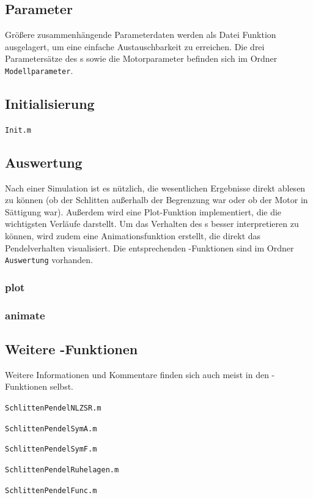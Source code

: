 \subsection{Parameter}

Größere zusammenhängende Parameterdaten werden als Datei \bzw Funktion ausgelagert, um eine einfache Austauschbarkeit zu erreichen.
Die drei Parametersätze des \spd s  sowie die Motorparameter befinden sich im Ordner \texttt{Modellparameter}.


\subsection{Initialisierung}\label{subsec:init}

\texttt{Init.m}


\subsection{Auswertung}

Nach einer Simulation ist es nützlich, die wesentlichen Ergebnisse direkt ablesen zu können (\zB ob der Schlitten außerhalb der Begrenzung war oder ob der Motor in Sättigung war).
Außerdem wird eine Plot-Funktion implementiert, die die wichtigsten Verläufe darstellt.
Um das Verhalten des \dpd s besser interpretieren zu können, wird zudem eine Animationsfunktion erstellt, die direkt das Pendelverhalten visualisiert.
Die entsprechenden \ml-Funktionen sind im Ordner \texttt{Auswertung} vorhanden.

\subsubsection{plot}

\subsubsection{animate}



\subsection{Weitere \Matlab-Funktionen}

Weitere Informationen und Kommentare finden sich auch meist in den \ml-Funktionen selbst.


\texttt{SchlittenPendelNLZSR.m}

\texttt{SchlittenPendelSymA.m}

\texttt{SchlittenPendelSymF.m}

\texttt{SchlittenPendelRuhelagen.m}

\texttt{SchlittenPendelFunc.m}